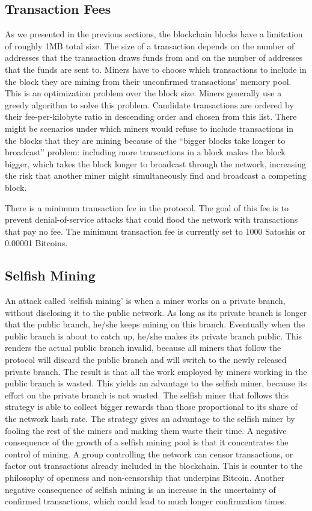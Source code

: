 \documentclass{article}
\begin{document}
\subsection*{Transaction Fees}
As we presented in the previous sections, the blockchain blocks have a limitation of roughly 1MB total size. The size of a transaction depends on the number of addresses that the transaction draws funds from and on the number of addresses that the funds are sent to.\newline
Miners have to choose which transactions to include in the block they are mining from their unconfirmed transactions’ memory pool. This is an optimization problem over the block size. Miners generally use a greedy algorithm to solve this problem. Candidate transactions are ordered by their fee-per-kilobyte ratio in descending order and chosen from this list. There might be scenarios under which miners would refuse to include transactions in the blocks that they are mining because of the “bigger blocks take longer to broadcast” problem: including more transactions in a block makes the block bigger, which takes the block longer to broadcast through the network, increasing the risk that another miner might simultaneously find and broadcast a competing block.\par\noindent
There is a minimum transaction fee in the protocol. The goal of this fee is to prevent denial-of-service attacks that could flood the network with transactions that pay no fee. The minimum transaction fee is currently set to 1000 Satoshis or 0.00001 Bitcoins.

\subsection*{Selfish Mining}
An attack called ‘selfish mining’ is when a miner works on a private branch, without disclosing it to the public network. As long as its private branch is longer that the public branch, he/she keeps mining on this branch. Eventually when the public branch is about to catch up, he/she makes its private branch public. This renders the actual public branch invalid, because all miners that follow the protocol will discard the public branch and will switch to the newly released private branch. The result is that all the work employed by miners working in the public branch is wasted. This yields an advantage to the selfish miner, because its effort on the private branch is not wasted. The selfish miner that follows this strategy is able to collect bigger rewards than those proportional to its share of the network hash rate. The strategy gives an advantage to the selfish miner by fooling the rest of the miners and making them waste their time. A negative consequence of the growth of a selfish mining pool is that it concentrates the control of mining. A group controlling the network can censor transactions, or factor out transactions already included in the blockchain. This is counter to the philosophy of openness and non-censorship that underpins Bitcoin. Another negative consequence of selfish mining is an increase in the uncertainty of confirmed transactions, which could lead to much longer confirmation times.
\end{document}
